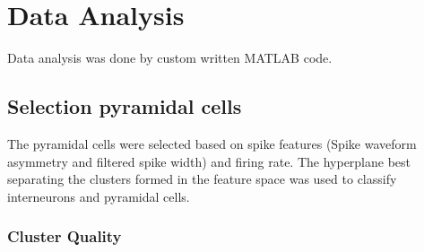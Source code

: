 \chapter{Data Analysis}
\label{analysis}

Data analysis was done by custom written MATLAB code. 
\section{Selection pyramidal cells}
The pyramidal cells were selected based on spike features (Spike waveform asymmetry and filtered spike width) \cite{Sirota2008} and firing rate. The hyperplane best separating the clusters formed in the feature space was used to classify interneurons and pyramidal cells.

\subsection{Cluster Quality}

